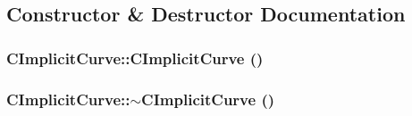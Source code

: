 \subsection{Constructor \& Destructor Documentation}
\hypertarget{classCImplicitCurve_a2155b648384213759f6d443d54fef0bf}{
\subsubsection[{CImplicitCurve}]{\setlength{\rightskip}{0pt plus 5cm}CImplicitCurve::CImplicitCurve ()}}
\label{classCImplicitCurve_a2155b648384213759f6d443d54fef0bf}
\hypertarget{classCImplicitCurve_aba7466bd5d66bd2a044e737f8670e23d}{
\subsubsection[{$\sim$CImplicitCurve}]{\setlength{\rightskip}{0pt plus 5cm}CImplicitCurve::$\sim$CImplicitCurve ()}}
\label{classCImplicitCurve_aba7466bd5d66bd2a044e737f8670e23d}


